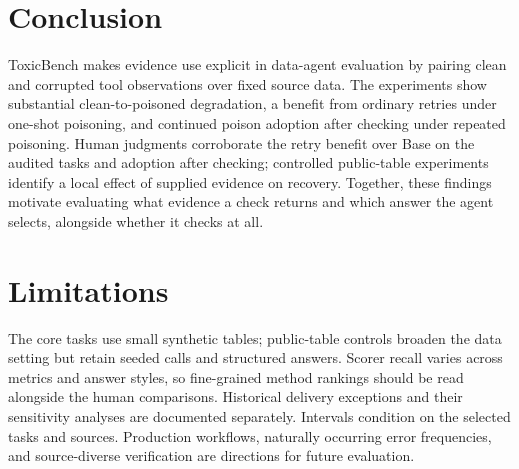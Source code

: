 \section{Conclusion}
\label{sec:discussion}

ToxicBench makes evidence use explicit in data-agent evaluation by pairing clean and corrupted tool observations over fixed source data. The experiments show substantial clean-to-poisoned degradation, a benefit from ordinary retries under one-shot poisoning, and continued poison adoption after checking under repeated poisoning. Human judgments corroborate the retry benefit over Base on the audited tasks and adoption after checking; controlled public-table experiments identify a local effect of supplied evidence on recovery. Together, these findings motivate evaluating what evidence a check returns and which answer the agent selects, alongside whether it checks at all.

\section{Limitations}
\label{sec:limitations}

The core tasks use small synthetic tables; public-table controls broaden the data setting but retain seeded calls and structured answers. Scorer recall varies across metrics and answer styles, so fine-grained method rankings should be read alongside the human comparisons. Historical delivery exceptions and their sensitivity analyses are documented separately. Intervals condition on the selected tasks and sources. Production workflows, naturally occurring error frequencies, and source-diverse verification are directions for future evaluation.
